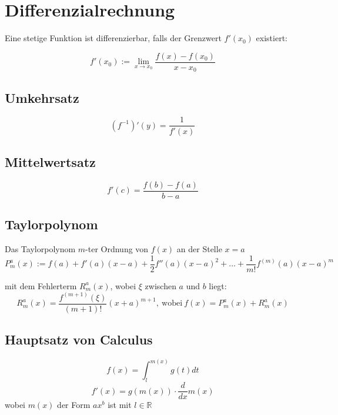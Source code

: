 \documentclass[11pt]{article}
\begin{document}
\section{Differenzialrechnung}

Eine stetige Funktion ist differenzierbar, falls der Grenzwert $f'(x_0)$ existiert:

\begin{equation*}
	f'(x_0) := \lim_{x\to x_0}\frac{f(x) - f(x_0)}{x-x_0}
\end{equation*}

\subsection{Umkehrsatz}

\begin{equation*}
	(f^{-1})'(y) = \frac{1}{f'(x)}
\end{equation*}

\subsection{Mittelwertsatz}

\begin{equation*}
	f'(c) = \frac{f(b) - f(a)}{b - a}
\end{equation*}

\subsection{Taylorpolynom}

Das Taylorpolynom $m$-ter Ordnung von $f(x)$ an der Stelle $x=a$
\begin{equation*}
	P^a_m(x) := f(a) + f'(a)(x-a) + \frac{1}{2}f''(a)(x-a)^2 + ... + \frac{1}{m!} f^{(m)}(a)(x-a)^m
\end{equation*}

mit dem Fehlerterm $R^a_m(x)$, wobei $\xi$ zwischen $a$ und $b$ liegt:
\begin{equation*}
	R^a_m(x) = \frac{f^{(m+1)}(\xi)}{(m+1)!}(x+a)^{m+1},\ \text{wobei}\ f(x) = P^a_m(x) + R^a_m(x)
\end{equation*}

\subsection{Hauptsatz von Calculus}
\begin{equation*}
	f(x)=\int^{m(x)}_lg(t)dt
\end{equation*}
\begin{equation*}
	f'(x)=g(m(x))\cdot\frac{d}{dx}m(x)
\end{equation*}
wobei $m(x)$ der Form $ax^b$ ist mit $l\in \mathbb{R}$
\end{document}
